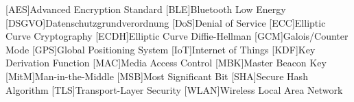 \begin{acronym}[AAAAA]

    [AES]{Advanced Encryption Standard}
    [BLE]{Bluetooth Low Energy}
    [DSGVO]{Datenschutzgrundverordnung}
    [DoS]{Denial of Service}
    [ECC]{Elliptic Curve Cryptography}
    [ECDH]{Elliptic Curve Diffie-Hellman}
    [GCM]{Galois/Counter Mode}
    [GPS]{Global Positioning System}
    [IoT]{Internet of Things}
    [KDF]{Key Derivation Function}
    [MAC]{Media Access Control}
    [MBK]{Master Beacon Key}
    [MitM]{Man-in-the-Middle}
    [MSB]{Most Significant Bit}
    [SHA]{Secure Hash Algorithm}
    [TLS]{Transport-Layer Security}
    [WLAN]{Wireless Local Area Network}
    
\end{acronym}